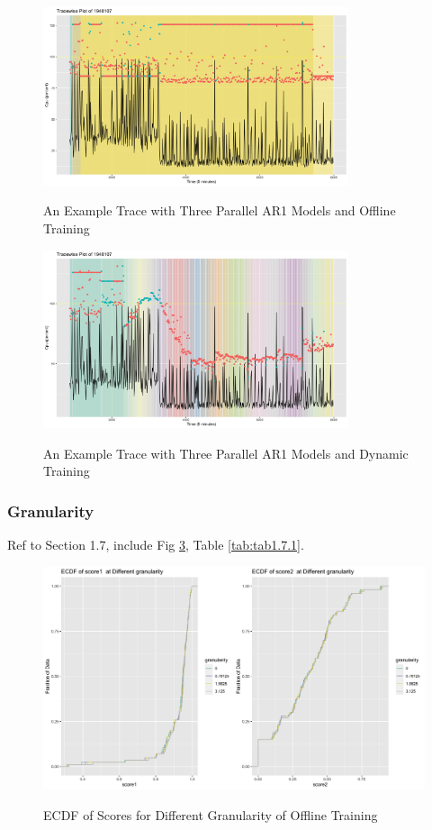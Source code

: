 \documentclass{article}
\begin{document}
\begin{figure}
    \caption{An Example Trace with Three Parallel AR1 Models and Offline Training}
    \centering
    \includegraphics[width = 0.8\textwidth]{images/Tracewise Plot of 1948107, AR1, offline.png}
    \label{fig:fig1.6.2}
\end{figure}

\begin{figure}
    \caption{An Example Trace with Three Parallel AR1 Models and Dynamic Training}
    \centering
    \includegraphics[width = 0.8\textwidth]{images/Tracewise Plot of 1948107, AR1, dynamic.png}
    \label{fig:fig1.6.3}
\end{figure}

\subsubsection{Granularity}
Ref to Section 1.7, include Fig \ref{fig:fig1.7.1}, Table \ref{tab:tab1.7.1}.

\begin{figure}
    \caption{ECDF of Scores for Different Granularity of Offline Training}
    \centering
    \includegraphics{images/ECDFofscoresatDifferentGranularityOfAR1ModelOfflineTrainingPolicy.png}
    \label{fig:fig1.7.1}
\end{figure}
\end{document}
